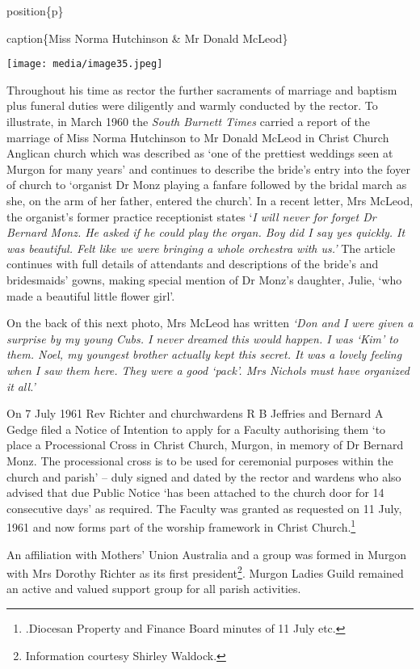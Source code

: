 position\{p\}

caption\{Miss Norma Hutchinson \& Mr Donald McLeod\}

\texttt{[image: media/image35.jpeg]}

Throughout his time as rector the further sacraments of marriage and baptism plus funeral duties were diligently and warmly conducted by the rector. To illustrate, in March 1960 the \emph{South Burnett Times} carried a report of the marriage of Miss Norma Hutchinson to Mr Donald McLeod in Christ Church Anglican church which was described as `one of the prettiest weddings seen at Murgon for many years' and continues to describe the bride's entry into the foyer of church to `organist Dr Monz playing a fanfare followed by the bridal march as she, on the arm of her father, entered the church'. In a recent letter, Mrs McLeod, the organist's former practice receptionist states `\emph{I will never for forget Dr Bernard Monz. He asked if he could play the organ. Boy did I say yes quickly. It was beautiful. Felt like we were bringing a whole orchestra with us.'} The article continues with full details of attendants and descriptions of the bride's and bridesmaids' gowns, making special mention of Dr Monz's daughter, Julie, `who made a beautiful little flower girl'.

On the back of this next photo, Mrs McLeod has written \emph{`Don and I were given a surprise by my young Cubs. I never dreamed this would happen. I was `Kim' to them. Noel, my youngest brother actually kept this secret. It was a lovely feeling when I saw them here. They were a good `pack'. Mrs Nichols must have organized it} \emph{all.'}

On 7 July 1961 Rev Richter and churchwardens R B Jeffries and Bernard A Gedge filed a Notice of Intention to apply for a Faculty authorising them `to place a Processional Cross in Christ Church, Murgon, in memory of Dr Bernard Monz. The processional cross is to be used for ceremonial purposes within the church and parish' -- duly signed and dated by the rector and wardens who also advised that due Public Notice `has been attached to the church door for 14 consecutive days' as required. The Faculty was granted as requested on 11 July, 1961 and now forms part of the worship framework in Christ Church.\footnote{.Diocesan Property and Finance Board minutes of 11 July etc.}

An affiliation with Mothers' Union Australia and a group was formed in Murgon with Mrs Dorothy Richter as its first president\footnote{Information courtesy Shirley Waldock.}. Murgon Ladies Guild remained an active and valued support group for all parish activities.

